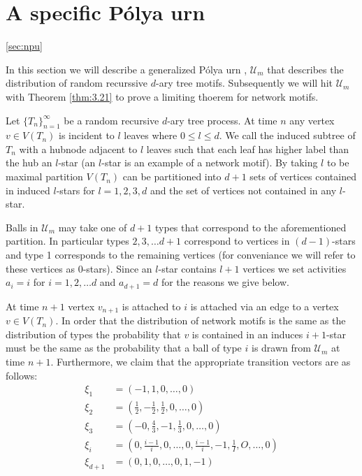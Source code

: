 \documentclass[8pt]{article} %
\theoremstyle{definition}
\begin{document}
\section{A specific P\'{o}lya urn}\ref{sec:npu}

In this section we will describe a generalized P\'{o}lya urn , $\mathcal{U}_m$ that describes the distribution of random recurssive $d$-ary tree motifs.  Subsequently we will hit $\mathcal{U}_m$ with Theorem \ref{thm:3.21} to prove a limiting thoerem for network motifs.

Let $\{T_n\}_{n=1}^{\infty}$ be a random recursive $d$-ary tree process.  At time $n$ any vertex $v \in V(T_n)$ is incident to $l$ leaves where $0 \leq l \leq d$.  We call the induced subtree of $T_n$ with a hubnode adjacent to $l$ leaves such that each leaf has higher label than the hub an $l$-star (an $l$-star is an example of a network motif).  By taking $l$ to be maximal partition $V(T_n)$ can be partitioned into $d+1$ sets of vertices contained in induced $l$-stars for $l=1,2,3, d$ and the set of vertices not contained in any $l$-star.

Balls in $\mathcal{U}_m$  may take one of $d+1$ types that correspond to the aforementioned partition. In particular types $2,3,\dots d+1$ correspond to vertices in $(d-1)$-stars  and type 1 corresponds to the remaining vertices (for conveniance we will refer to these vertices as 0-stars).  Since an $l$-star contains $l+1$ vertices we set activities $a_i = i$ for $i = 1,2,\dots d$ and $a_{d+1} = d$ for the reasons we give below.

At time $n+1$ vertex $v_{n+1}$ is attached to $i$ is attached via an edge to a vertex $v\in V(T_n)$.  In order that the distribution of network motifs is the same as the distribution of types the probability that $v$ is contained in an induces $i+1$-star must be the same as the probability that a ball of type $i$ is drawn from $\mathcal{U}_m$ at time $n+1$.  Furthermore, we claim that the appropriate transition vectors are as follows:
\begin{align*}
 \xi_{1} &= (-1,1,0,\dots,0) \\
 \xi_{2} &= (\frac{1}{2},-\frac{1}{2},\frac{1}{2},0,\dots,0) \\
 \xi_{3} &= (-0,\frac{4}{3},-1,\frac{1}{3},0,\dots,0) \\
 \xi_{i} &= (0,\frac{i-1}{i},0,\dots,0, \frac{i-1}{i},-1,\frac{1}{I},O,\dots,0) \\
 \xi_{d+1} &= (0,1,0,\dots,0,1,-1) \\
\end{align*}
\end{document}
